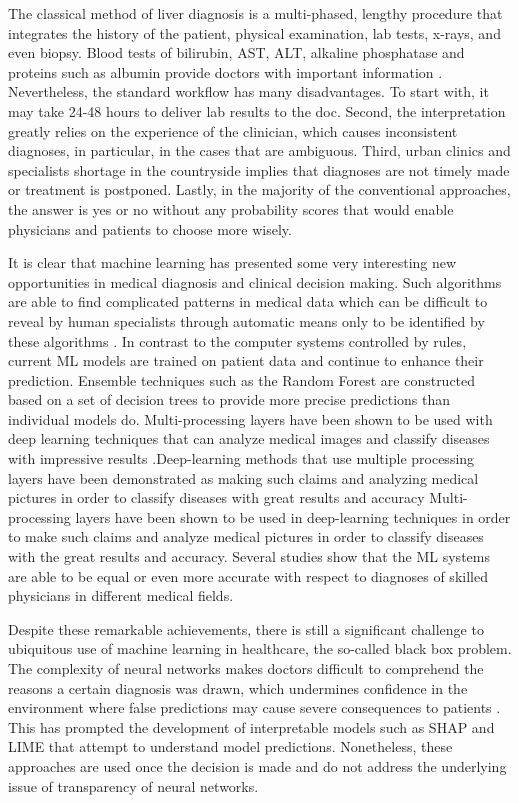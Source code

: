 \documentclass[conference]{IEEEtran}
\begin{document}
The classical method of liver diagnosis is a multi-phased, lengthy procedure that integrates the history of the patient, physical examination, lab tests, x-rays, and even biopsy. Blood tests of bilirubin, AST, ALT, alkaline phosphatase and proteins such as albumin provide doctors with important information \cite{ramana2011}. Nevertheless, the standard workflow has many disadvantages. To start with, it may take 24-48 hours to deliver lab results to the doc. Second, the interpretation greatly relies on the experience of the clinician, which causes inconsistent diagnoses, in particular, in the cases that are ambiguous. Third, urban clinics and specialists shortage in the countryside implies that diagnoses are not timely made or treatment is postponed. Lastly, in the majority of the conventional approaches, the answer is yes or no without any probability scores that would enable physicians and patients to choose more wisely.

It is clear that machine learning has presented some very interesting new opportunities in medical diagnosis and clinical decision making. Such algorithms are able to find complicated patterns in medical data which can be difficult to reveal by human specialists through automatic means only to be identified by these algorithms \cite{lecun2015, rajkomar2018}. In contrast to the computer systems controlled by rules, current ML models are trained on patient data and continue to enhance their prediction. Ensemble techniques such as the Random Forest are constructed based on a set of decision trees to provide more precise predictions than individual models do\cite{breiman2001}. Multi-processing layers have been shown to be used with deep learning techniques that can analyze medical images and classify diseases with impressive results \cite{esteva2017}.Deep-learning methods that use multiple processing layers have been demonstrated as making such claims and analyzing medical pictures in order to classify diseases with great results and accuracy Multi-processing layers have been shown to be used in deep-learning techniques in order to make such claims and analyze medical pictures in order to classify diseases with the great results and accuracy. Several studies show that the ML systems are able to be equal or even more accurate with respect to diagnoses of skilled physicians in different medical fields.

Despite these remarkable achievements, there is still a significant challenge to ubiquitous use of machine learning in healthcare, the so-called black box problem. The complexity of neural networks makes doctors difficult to comprehend the reasons a certain diagnosis was drawn, which undermines confidence in the environment where false predictions may cause severe consequences to patients \cite{ribeiro2016, lundberg2017}. This has prompted the development of interpretable models such as SHAP and LIME that attempt to understand model predictions. Nonetheless, these approaches are used once the decision is made and do not address the underlying issue of transparency of neural networks.
\end{document}
